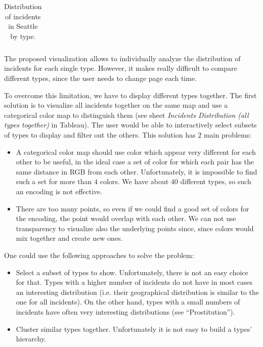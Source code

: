\begin{longtable}{ | >{\arraybackslash} m{3.8cm} | >{\arraybackslash} m{11.2cm} | }
    \caption{Distribution of incidents in Seattle by type.}
    \label{tab:distribution_by_type}
\end{longtable}

The proposed visualization allows to individually analyze the distribution of incidents for each single type.
However, it makes really difficult to compare different types, since the user needs to change page each time.

To overcome this limitation, we have to display different types together.
The first solution is to visualize all incidents together on the same map and use a categorical color map to distinguish them (see sheet \textit{Incidents Distribution (all types together)} in Tableau).
The user would be able to interactively select subsets of types to display and filter out the others.
This solution has $2$ main problems:
\begin{itemize}
    \item A categorical color map should use color which appear very different for each other to be useful, in the ideal case a set of color for which each pair has the same distance in RGB from each other. Unfortunately, it is impossible to find such a set for more than $4$ colors. We have about $40$ different types, so such an encoding is not effective.
    \item There are too many points, so even if we could find a good set of colors for the encoding, the point would overlap with each other. We can not use transparency to visualize also the underlying points since, since colors would mix together and create new ones.
\end{itemize}

One could use the following approaches to solve the problem:
\begin{itemize}
    \item Select a subset of types to show. Unfortunately, there is not an easy choice for that. Types with a higher number of incidents do not have in most cases an interesting distribution (i.e. their geographical distribution is similar to the one for all incidents). On the other hand, types with a small numbers of incidents have often very interesting distributions (see ``Prostitution'').
    \item Cluster similar types together. Unfortunately it is not easy to build a types' hierarchy.
\end{itemize}

